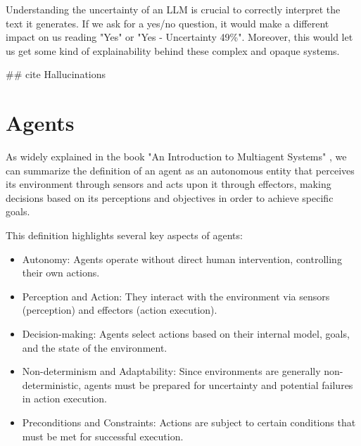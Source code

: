 Understanding the uncertainty of an LLM is crucial to correctly interpret the text
it generates. If we ask for a yes/no question, it would make a different impact on
us reading "Yes" or "Yes - Uncertainty 49\%". Moreover, this would let us get
some kind of explainability behind these complex and opaque systems.

\#\# cite Hallucinations

\section{Agents}
\label{sec:agents}


As widely explained in the book "An Introduction to Multiagent Systems"
\cite{wooldridge2002multiagent}, we can summarize the definition of an agent as an
autonomous entity that perceives its environment through sensors and acts upon it
through effectors, making decisions based on its perceptions and objectives in
order to achieve specific goals.

This definition highlights several key aspects of agents:
\begin{itemize}
  \item Autonomy: Agents operate without direct human intervention, controlling their
    own actions.

  \item Perception and Action: They interact with the environment via sensors (perception)
    and effectors (action execution).

  \item Decision-making: Agents select actions based on their internal model, goals,
    and the state of the environment.

  \item Non-determinism and Adaptability: Since environments are generally non-deterministic,
    agents must be prepared for uncertainty and potential failures in action execution.

  \item Preconditions and Constraints: Actions are subject to certain conditions
    that must be met for successful execution.
\end{itemize}


